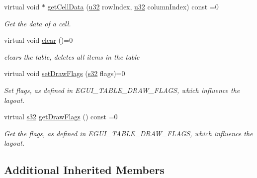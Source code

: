 \begin{DoxyCompactItemize}
\mbox{\label{classirr_1_1gui_1_1IGUITable_a73332c6970e47345d42dde26f1b992cd}} 
virtual void $\ast$ \hyperlink{classirr_1_1gui_1_1IGUITable_a73332c6970e47345d42dde26f1b992cd}{get\+Cell\+Data} (\hyperlink{namespaceirr_a0416a53257075833e7002efd0a18e804}{u32} row\+Index, \hyperlink{namespaceirr_a0416a53257075833e7002efd0a18e804}{u32} column\+Index) const =0
\begin{DoxyCompactList}\small\item\em Get the data of a cell. \end{DoxyCompactList}\item 
\mbox{\label{classirr_1_1gui_1_1IGUITable_ad0b1f8cefa1cbdcede986b16abc868c0}} 
virtual void \hyperlink{classirr_1_1gui_1_1IGUITable_ad0b1f8cefa1cbdcede986b16abc868c0}{clear} ()=0
\begin{DoxyCompactList}\small\item\em clears the table, deletes all items in the table \end{DoxyCompactList}\item 
\mbox{\label{classirr_1_1gui_1_1IGUITable_ae777eb5b146642659801d1af32b9c978}} 
virtual void \hyperlink{classirr_1_1gui_1_1IGUITable_ae777eb5b146642659801d1af32b9c978}{set\+Draw\+Flags} (\hyperlink{namespaceirr_ac66849b7a6ed16e30ebede579f9b47c6}{s32} flags)=0
\begin{DoxyCompactList}\small\item\em Set flags, as defined in E\+G\+U\+I\+\_\+\+T\+A\+B\+L\+E\+\_\+\+D\+R\+A\+W\+\_\+\+F\+L\+A\+GS, which influence the layout. \end{DoxyCompactList}\item 
\mbox{\label{classirr_1_1gui_1_1IGUITable_aeb6fc401f70a8aa21225663ec9195ee1}} 
virtual \hyperlink{namespaceirr_ac66849b7a6ed16e30ebede579f9b47c6}{s32} \hyperlink{classirr_1_1gui_1_1IGUITable_aeb6fc401f70a8aa21225663ec9195ee1}{get\+Draw\+Flags} () const =0
\begin{DoxyCompactList}\small\item\em Get the flags, as defined in E\+G\+U\+I\+\_\+\+T\+A\+B\+L\+E\+\_\+\+D\+R\+A\+W\+\_\+\+F\+L\+A\+GS, which influence the layout. \end{DoxyCompactList}\end{DoxyCompactItemize}
\subsection*{Additional Inherited Members}


